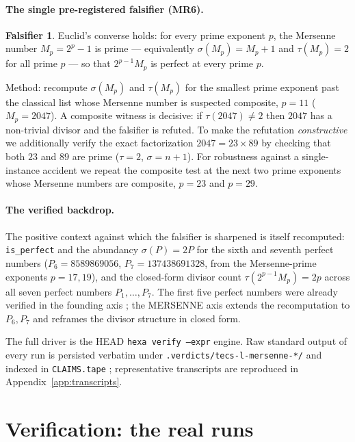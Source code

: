 \documentclass[11pt,a4paper]{article}
\newcommand{\sig}{\sigma}
\newcommand{\Mp}{M_p}
\theoremstyle{definition}
\newtheorem{falsifier}{Falsifier}
\begin{document}
\paragraph{The single pre-registered falsifier (MR6).}
\begin{falsifier}\label{fals:1}
Euclid's converse holds: for every prime exponent $p$, the Mersenne number
$\Mp = 2^p-1$ is prime --- equivalently $\sig(\Mp)=\Mp+1$ and $\tau(\Mp)=2$ for
all prime $p$ --- so that $2^{p-1}\Mp$ is perfect at every prime $p$.
\end{falsifier}
\noindent
Method: recompute $\sig(\Mp)$ and $\tau(\Mp)$ for the smallest prime exponent past
the classical list whose Mersenne number is suspected composite, $p=11$
($\Mp = 2047$). A composite witness is decisive: if $\tau(2047)\neq 2$ then
$2047$ has a non-trivial divisor and the falsifier is refuted. To make the
refutation \emph{constructive} we additionally verify the exact factorization
$2047 = 23\times 89$ by checking that both $23$ and $89$ are prime
($\tau = 2$, $\sig = n+1$). For robustness against a single-instance accident we
repeat the composite test at the next two prime exponents whose Mersenne numbers
are composite, $p=23$ and $p=29$.

\paragraph{The verified backdrop.} The positive context against which the
falsifier is sharpened is itself recomputed: \texttt{is\_perfect} and the
abundancy $\sig(P)=2P$ for the sixth and seventh perfect numbers
($P_6 = 8589869056$, $P_7 = 137438691328$, from the Mersenne-prime exponents
$p=17,19$), and the closed-form divisor count $\tau(2^{p-1}\Mp)=2p$ across all
seven perfect numbers $P_1,\dots,P_7$. The first five perfect numbers were
already verified in the founding axis \citep{tecs-l-locus}; the MERSENNE axis
extends the recomputation to $P_6,P_7$ and reframes the divisor structure in
closed form.

The full driver is the HEAD \texttt{hexa verify --expr} engine. Raw standard
output of every run is persisted verbatim under \texttt{.verdicts/tecs-l-mersenne-*/}
and indexed in \texttt{CLAIMS.tape} \citep{tecs-l-claims}; representative
transcripts are reproduced in Appendix~\ref{app:transcripts}.

\section{Verification: the real runs}
\label{sec:verification}
\end{document}

